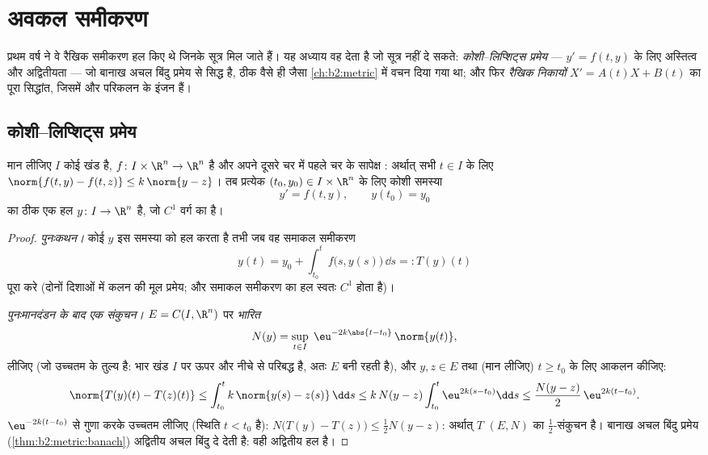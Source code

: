 \chapter{अवकल समीकरण}\label{ch:b2:diffeq}

प्रथम वर्ष ने वे रैखिक समीकरण हल किए थे जिनके सूत्र मिल जाते हैं। यह
अध्याय वह देता है जो सूत्र नहीं दे सकते: \emph{कोशी--लिप्शिट्स प्रमेय} ---
$y' = f(t, y)$ के लिए अस्तित्व और अद्वितीयता --- जो बानाख अचल बिंदु प्रमेय से सिद्ध
है, ठीक वैसे ही जैसा \cref{ch:b2:metric} में वचन दिया गया था; और फिर \emph{रैखिक निकायों}
$X' = A(t)X + B(t)$ का पूरा सिद्धांत, जिसमें  और  परिकलन के इंजन
हैं।

\section{कोशी--लिप्शिट्स प्रमेय}

\begin{theorem}[कोशी--लिप्शिट्स, वैश्विक लिप्शिट्स रूप]\label{thm:b2:diffeq:cauchylipschitz}
मान लीजिए $I$ कोई खंड है, $f \colon I \times \R^n \to \R^n$  है और अपने दूसरे चर में पहले चर के
सापेक्ष  \emph{}: अर्थात् सभी $t
\in I$ के लिए $\norm{f(t, y) - f(t, z)} \leq k\,\norm{y - z}$। तब
प्रत्येक $(t_0, y_0) \in I \times \R^n$ के लिए कोशी समस्या
\[
y' = f(t, y), \qquad y(t_0) = y_0
\]
का ठीक एक हल $y \colon I \to \R^n$ है, जो $C^1$ वर्ग का है।
\end{theorem}

\begin{proof}
\emph{पुनःकथन।} कोई  $y$ इस समस्या को हल करता है तभी जब वह समाकल
समीकरण
\[
y(t) = y_0 + \int_{t_0}^{t} f\bigl(s, y(s)\bigr)\,\dd s
=: T(y)(t)
\]
पूरा करे (दोनों दिशाओं में कलन की मूल प्रमेय; और समाकल समीकरण का  हल
स्वतः $C^1$ होता है)।

\emph{पुनःमानदंडन के बाद एक संकुचन।}  $E =
C(I, \R^n)$ पर \emph{भारित}
\[
N(y) = \sup_{t \in I}\; \eu^{-2k\abs{t - t_0}}\,\norm{y(t)} ,
\]
लीजिए (जो उच्चतम  के तुल्य है: भार खंड $I$ पर ऊपर और नीचे से परिबद्ध
है, अतः $E$  बनी रहती है), और $y, z \in
E$ तथा (मान लीजिए) $t \geq t_0$ के लिए आकलन
कीजिए:
\[
\norm{T(y)(t) - T(z)(t)}
\leq \int_{t_0}^{t} k\,\norm{y(s) - z(s)}\,\dd s
\leq k\,N(y - z)\int_{t_0}^{t} \eu^{2k(s - t_0)}\dd s
\leq \frac{N(y-z)}{2}\,\eu^{2k(t - t_0)} .
\]
$\eu^{-2k(t - t_0)}$ से गुणा करके उच्चतम लीजिए (स्थिति $t
< t_0$  है): $N\bigl(T(y) - T(z)\bigr) \leq \frac12 N(y -
z)$: अर्थात् $T$
 $(E, N)$ का $\frac12$-संकुचन है। बानाख अचल बिंदु प्रमेय (\cref{thm:b2:metric:banach}) अद्वितीय अचल
बिंदु दे देती है: वही अद्वितीय हल है।
\end{proof}

